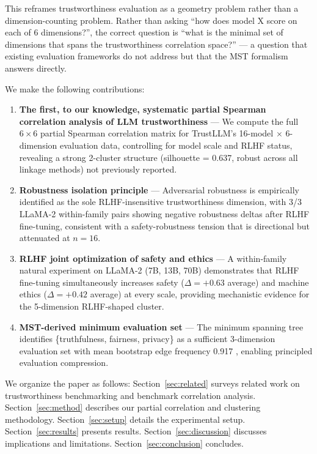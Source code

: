 This reframes trustworthiness evaluation as a geometry problem rather than a dimension-counting problem. Rather than asking ``how does model X score on each of 6 dimensions?'', the correct question is ``what is the minimal set of dimensions that spans the trustworthiness correlation space?'' --- a question that existing evaluation frameworks do not address but that the MST formalism answers directly.

We make the following contributions:

\begin{enumerate}
  \item \textbf{The first, to our knowledge, systematic partial Spearman correlation analysis of LLM trustworthiness} --- We compute the full $6 \times 6$ partial Spearman correlation matrix for TrustLLM's 16-model $\times$ 6-dimension evaluation data, controlling for model scale and RLHF status, revealing a strong 2-cluster structure (silhouette = 0.637, robust across all linkage methods) not previously reported.

  \item \textbf{Robustness isolation principle} --- Adversarial robustness is empirically identified as the sole RLHF-insensitive trustworthiness dimension, with 3/3 LLaMA-2 within-family pairs showing negative robustness deltas after RLHF fine-tuning, consistent with a safety-robustness tension that is directional but attenuated at $n=16$.

  \item \textbf{RLHF joint optimization of safety and ethics} --- A within-family natural experiment on LLaMA-2 (7B, 13B, 70B) demonstrates that RLHF fine-tuning simultaneously increases safety ($\Delta = +0.63$ average) and machine ethics ($\Delta = +0.42$ average) at every scale, providing mechanistic evidence for the 5-dimension RLHF-shaped cluster.

  \item \textbf{MST-derived minimum evaluation set} --- The minimum spanning tree identifies \{truthfulness, fairness, privacy\} as a sufficient 3-dimension evaluation set with mean bootstrap edge frequency 0.917 \cite{tumminello2005tool}, enabling principled evaluation compression.
\end{enumerate}

We organize the paper as follows: Section~\ref{sec:related} surveys related work on trustworthiness benchmarking and benchmark correlation analysis. Section~\ref{sec:method} describes our partial correlation and clustering methodology. Section~\ref{sec:setup} details the experimental setup. Section~\ref{sec:results} presents results. Section~\ref{sec:discussion} discusses implications and limitations. Section~\ref{sec:conclusion} concludes.
